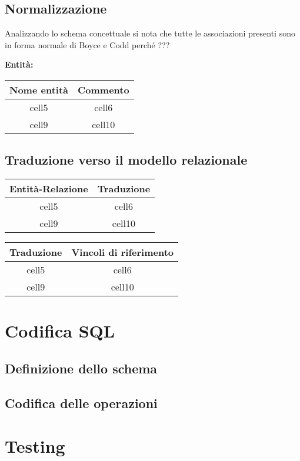 \documentclass{article}
\begin{document}
\subsection{Normalizzazione}
Analizzando lo schema concettuale si nota che tutte le associazioni presenti
sono in forma normale di Boyce e Codd perché ???

\textbf{Entità:}

\begin{tabular}{ |c|c| }
	\hline
	\textbf{Nome entità} & \textbf{Commento} \\
	\hline
	cell5                & cell6             \\
	\hline
	cell9                & cell10            \\
	\hline
\end{tabular}

\subsection{Traduzione verso il modello relazionale}

\begin{tabular}{ |c|c| }
	\hline
	\textbf{Entità-Relazione} & \textbf{Traduzione} \\
	\hline
	cell5                     & cell6               \\
	\hline
	cell9                     & cell10              \\
	\hline
\end{tabular}

\begin{tabular}{ |c|c| }
	\hline
	\textbf{Traduzione} & \textbf{Vincoli di riferimento} \\
	\hline
	cell5               & cell6                           \\
	\hline
	cell9               & cell10                          \\
	\hline
\end{tabular}


\section{Codifica SQL}

\subsection{Definizione dello schema}

\subsection{Codifica delle operazioni}

\section{Testing}
\end{document}
